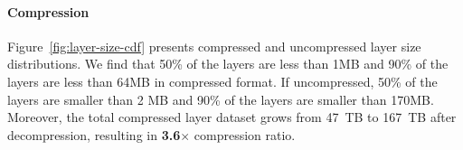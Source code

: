 
%

\paragraph{Compression}
%
Figure~\ref{fig:layer-size-cdf} presents compressed and uncompressed layer size
distributions.
%
We find that 50\% of the layers are less than 1MB and 90\% of the layers are
less than 64MB in compressed format.
%
If uncompressed, 50\% of the layers are smaller than 2 MB and 90\% of the
layers are smaller than 170MB.
%
Moreover, the total compressed layer dataset grows from 47~TB to 167~TB after decompression, resulting in \textbf{3.6$\times$} compression ratio.

